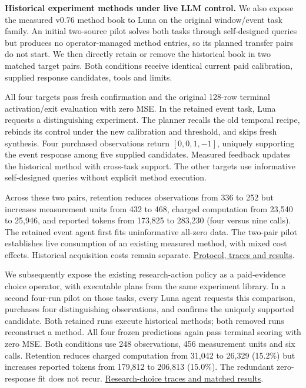 \documentclass[twoside,11pt]{article}
\begin{document}
\textbf{Historical experiment methods under live LLM control.} We also expose the
measured v0.76 method book to Luna on the original window/event task family.
An initial two-source pilot solves both tasks through self-designed queries but
produces no operator-managed method entries, so its planned transfer pairs do
not start. We then directly retain or remove the historical book in two matched
target pairs. Both conditions receive identical current paid calibration,
supplied response candidates, tools and limits.


All four targets pass fresh confirmation and the original 128-row terminal
activation/exit evaluation with zero MSE. In the retained event task, Luna
requests a distinguishing experiment. The planner recalls the old temporal
recipe, rebinds its control under the new calibration and threshold, and skips
fresh synthesis. Four purchased observations return \([0,0,1,-1]\), uniquely
supporting the event response among five supplied candidates. Measured feedback
updates the historical method with cross-task support. The other targets use
informative self-designed queries without explicit method execution.


Across these two pairs, retention reduces observations from 336 to 252 but
increases measurement units from 432 to 468, charged computation from 23,540 to
25,946, and reported tokens from 173,825 to 283,230 (four versus nine calls).
The retained event agent first fits uninformative all-zero data. The two-pair
pilot establishes live consumption of an existing measured method, with mixed
cost effects. Historical acquisition costs remain separate.
\hyperlink{artifact-75}{Protocol, traces and results}.


We subsequently expose the existing research-action policy as a paid-evidence
choice operator, with executable plans from the same experiment library. In a
second four-run pilot on those tasks, every Luna agent requests this comparison,
purchases four distinguishing observations, and confirms the uniquely supported
candidate. Both retained runs execute historical methods; both removed runs
reconstruct a method. All four frozen predictions again pass terminal scoring
with zero MSE. Both conditions use 248 observations, 456 measurement units and
six calls. Retention reduces charged computation from 31,042 to 26,329 (15.2\%)
but increases reported tokens from 179,812 to 206,813 (15.0\%). The redundant
zero-response fit does not recur.
\hyperlink{artifact-76}{Research-choice traces and matched results}.
\end{document}
